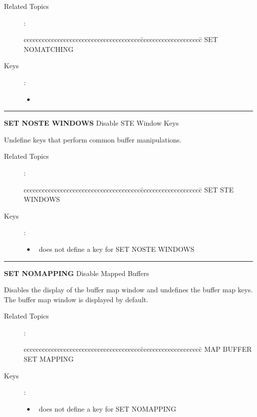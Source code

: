 \begin{description}
\item[Related Topics]:
\begin{tabbing}
cccccccccccccccccccccccccccccccccccccc\=cccccccccccccccccccc\=\kill
    SET NOMATCHING \\
\end{tabbing}

\item[Keys]:
       \begin{itemize}
       \item {}
       \end{itemize}

\end{description}

\goodbreak

\rule{\textwidth}{0.3mm}

{\Large {\bf SET NOSTE WINDOWS} \hfill Disable STE Window Keys}

\medskip
  Undefine keys that perform common buffer manipulations.

\begin{description}
\item[Related Topics]:
\begin{tabbing}
cccccccccccccccccccccccccccccccccccccc\=cccccccccccccccccccc\=\kill
    SET STE WINDOWS \\
\end{tabbing}

\item[Keys]:
          \begin{itemize}
          \item \STEve\ does not define a key for SET NOSTE WINDOWS
          \end{itemize}
\end{description}

\goodbreak

\rule{\textwidth}{0.3mm}

{\Large {\bf SET NOMAPPING} \hfill Disable Mapped Buffers}

\medskip
  Disables the display of the buffer map window and undefines the buffer
  map keys. The buffer map window is displayed by default.

\begin{description}
\item[Related Topics]:
\begin{tabbing}
cccccccccccccccccccccccccccccccccccccc\=cccccccccccccccccccc\=\kill
    MAP BUFFER \>   SET MAPPING \\
\end{tabbing}

\item[Keys]:
          \begin{itemize}
          \item \STEve\ does not define a key for SET NOMAPPING
          \end{itemize}
\end{description}

